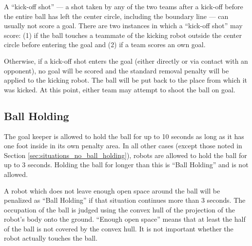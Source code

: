 \documentclass[12pt]{article}
\begin{document}
A ``kick-off shot'' --- a shot taken by any of the two teams after a kick-off before the entire ball has left the center circle, including the boundary line --- can usually not score a goal. There are two instances in which a ``kick-off shot'' may score: (1) if the ball touches a teammate of the kicking robot outside the center circle before entering the goal and (2) if a team scores an own goal.

Otherwise, if a kick-off shot enters the goal (either directly or via contact with an opponent), no goal will be scored and the standard removal penalty will be applied to the kicking robot. The ball will be put back to the place from which it was kicked. At this point, either team may attempt to shoot the ball on goal.

\subsection{Ball Holding}
\label{sec:ball_holding}

The goal keeper is allowed to hold the ball for up to 10 seconds as long as it has one foot inside in its own penalty area.  In all other cases (except those noted in Section \ref{sec:situations_no_ball_holding}), robots are allowed to hold the ball for up to 3 seconds. Holding the ball for longer than this is ``Ball Holding'' and is not allowed.

A robot which does not leave enough open space around the ball will be penalized as ``Ball Holding'' if that situation continues more than 3 seconds. The occupation of the ball is judged using the convex hull of the projection of the robot's body onto the ground. ``Enough open space'' means that at least the half of the ball is not covered by the convex hull. It is not important whether the robot actually touches the ball.
\end{document}
